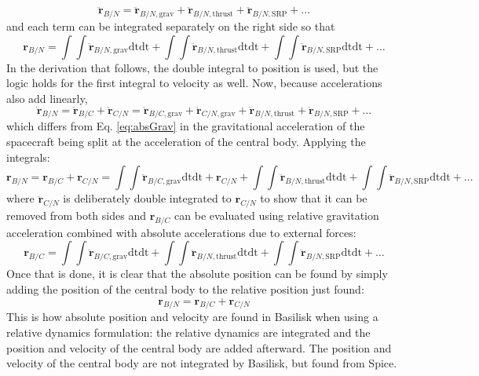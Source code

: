 \begin{equation}
	\ddot{\bm{r}}_{B/N} = \ddot{\bm{r}}_{B/N, \mathrm{grav}}  + \ddot{\bm{r}}_{B/N, \mathrm{thrust}} + \ddot{\bm{r}}_{B/N, \mathrm{SRP}} + \dots
	\label{eq:absGrav}
\end{equation}
and each term can be integrated separately on the right side so that
\begin{equation}
      \bm{r}_{B/N} = \int \int \ddot{\bm{r}}_{B/N, \mathrm{grav}} \mathrm{dtdt} +   \int \int \ddot{\bm{r}}_{B/N, \mathrm{thrust}} \mathrm{dtdt} +  \int \int \ddot{\bm{r}}_{B/N, \mathrm{SRP}}\mathrm{dt dt} +  \dots
\end{equation}
In the derivation that follows, the double integral to position is used, but the logic holds for the first integral to velocity as well. Now, because accelerations also add linearly,
\begin{equation}
\ddot{\bm{r}}_{B/N} = \ddot{\bm{r}}_{B/C} + \ddot{\bm{r}}_{C/N} = \ddot{\bm{r}}_{B/C, \mathrm{grav}} +  \ddot{\bm{r}}_{C/N, \mathrm{grav}}  + \ddot{\bm{r}}_{B/N, \mathrm{thrust}} + \ddot{\bm{r}}_{B/N, \mathrm{SRP}} + \dots
\end{equation}
which differs from Eq. \ref{eq:absGrav} in the gravitational acceleration of the spacecraft being split at the acceleration of the central body. Applying the integrals:
\begin{equation}
\bm{r}_{B/N} = \bm{r}_{B/C} + \bm{r}_{C/N} = \int \int \ddot{\bm{r}}_{B/C, \mathrm{grav}} \mathrm{dt dt} + \bm{r}_{C/N}  +   \int \int \ddot{\bm{r}}_{B/N, \mathrm{thrust}} \mathrm{dt dt} +  \int \int \ddot{\bm{r}}_{B/N, \mathrm{SRP}}\mathrm{dt dt} +  \dots
\end{equation}
where $\ddot{\bm{r}}_{C/N}$ is deliberately double integrated to $\bm{r}_{C/N}$ to show that it can be removed from both sides and $\bm{r}_{B/C}$ can be evaluated using relative gravitation acceleration combined with absolute accelerations due to external forces:
\begin{equation}
\bm{r}_{B/C}= \int \int \ddot{\bm{r}}_{B/C, \mathrm{grav}} \mathrm{dt dt} +   \int \int \ddot{\bm{r}}_{B/N, \mathrm{thrust}} \mathrm{dt dt} +  \int \int \ddot{\bm{r}}_{B/N, \mathrm{SRP}}\mathrm{dt dt} +  \dots
\end{equation}
Once that is done, it is clear that the absolute position can be found by simply adding the position of the central body to the relative position just found:
\begin{equation}
	\bm{r}_{B/N} = \bm{r}_{B/C} + \bm{r}_{C/N}
\end{equation}
This is how absolute position and velocity are found in Basilisk when using a relative dynamics formulation: the relative dynamics are integrated and the position and velocity of the central body are added afterward. The position and velocity of the central body are not integrated by Basilisk, but found from Spice.

